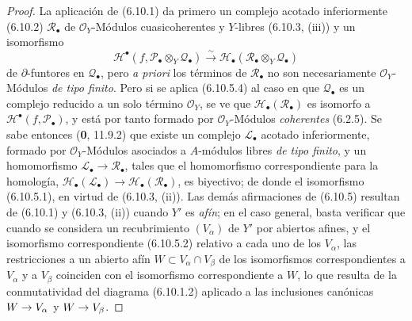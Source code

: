 \documentclass[10pt,oneside,openany]{book}
\theoremstyle{egaenv}\newtheorem*{env}{---}
\theoremstyle{egastatement}
\theoremstyle{egadescription}
\renewcommand{\to}{\mathchoice{\longrightarrow}{\rightarrow}{\rightarrow}{\rightarrow}}
\begin{document}
\begin{proof}
La aplicación de (6.10.1) da primero un complejo acotado inferiormente
(6.10.2) $\mathscr R_\bullet$ de $\mathscr O_Y$-Módulos cuasicoherentes y
$Y$-libres (6.10.3, (iii)) y un isomorfismo
\[
  \mathscr H^\bullet
  (f,\mathscr P_\bullet\otimes_Y\mathscr Q_\bullet)
  \xrightarrow{\sim}
  \mathscr H_\bullet
  (\mathscr R_\bullet\otimes_Y\mathscr Q_\bullet)
  \tag{6.10.5.4}\label{III.6.10.5.4.fr}
\]
de $\partial$-funtores en $\mathscr Q_\bullet$, pero \emph{a priori} los
términos de $\mathscr R_\bullet$ no son necesariamente
$\mathscr O_Y$-Módulos \emph{de tipo finito}. Pero si se aplica (6.10.5.4) al caso
en que $\mathscr Q_\bullet$ es un complejo reducido a un solo término
$\mathscr O_Y$, se ve que $\mathscr H_\bullet(\mathscr R_\bullet)$ es
isomorfo a $\mathscr H^\bullet(f,\mathscr P_\bullet)$, y está por tanto formado
por $\mathscr O_Y$-Módulos \emph{coherentes} (6.2.5). Se sabe entonces (\textbf{0}, 11.9.2) que
existe un complejo $\mathscr L_\bullet$ acotado inferiormente, formado por
$\mathscr O_Y$-Módulos asociados a $A$-módulos libres \emph{de tipo finito}, y un
homomorfismo $\mathscr L_\bullet\longrightarrow\mathscr R_\bullet$,
tales que el homomorfismo correspondiente para la homología,
$\mathscr H_\bullet(\mathscr L_\bullet)\longrightarrow\mathscr H_\bullet(\mathscr R_\bullet)$,
es biyectivo; de donde el isomorfismo (6.10.5.1), en virtud de (6.10.3, (ii)).
Las demás afirmaciones de (6.10.5) resultan de (6.10.1) y (6.10.3, (ii))
cuando $Y'$ es \emph{afín}; en el caso general, basta verificar que
cuando se considera un recubrimiento $(V_\alpha)$ de $Y'$ por abiertos
afines, y el isomorfismo correspondiente (6.10.5.2) relativo a cada uno de los
$V_\alpha$, las restricciones a un abierto afín
$W\subset V_\alpha\cap V_\beta$ de los isomorfismos correspondientes a
$V_\alpha$ y a $V_\beta$ coinciden con el isomorfismo correspondiente a
$W$, lo que resulta de la conmutatividad del diagrama (6.10.1.2) aplicado a las
inclusiones canónicas $W\to V_\alpha$ y $W\to V_\beta$.
\end{proof}
\end{document}
